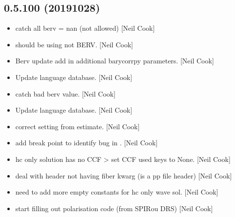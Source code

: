 \documentclass[a4paper,10pt,english]{report}
\begin{document}
\subsection{0.5.100 (2019\sphinxhyphen{}10\sphinxhyphen{}28)}
\label{\detokenize{misc/changelog:id62}}\begin{itemize}
\item {} 
 \sphinxhyphen{} catch all berv = nan (not allowed) {[}Neil
Cook{]}

\item {} 
 \sphinxhyphen{} should be using  not BERV. {[}Neil
Cook{]}

\item {} 
Berv update \sphinxhyphen{} add in additional barycorrpy parameters. {[}Neil Cook{]}

\item {} 
Update language database. {[}Neil Cook{]}

\item {} 
 \sphinxhyphen{} catch bad berv value. {[}Neil Cook{]}

\item {} 
Update language database. {[}Neil Cook{]}

\item {} 
 \sphinxhyphen{} correct setting  from estimate.
{[}Neil Cook{]}

\item {} 
 \sphinxhyphen{} add break point to identify bug in
. {[}Neil Cook{]}

\item {} 
 \sphinxhyphen{} hc only solution has no CCF \textendash{}\textgreater{} set CCF used
keys to None. {[}Neil Cook{]}

\item {} 
 \sphinxhyphen{} deal with header not having fiber kwarg (is a
pp file header) {[}Neil Cook{]}

\item {} 
 \sphinxhyphen{} need to add more empty constants for hc only
wave sol. {[}Neil Cook{]}

\item {} 
 \sphinxhyphen{} start filling out polarisation code (from SPIRou
DRS) {[}Neil Cook{]}


\end{itemize}
\end{document}
